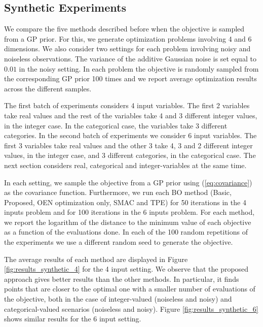 \subsection{Synthetic Experiments}

We compare the five methods described before when the objective is sampled from a GP prior. For this, we generate 
optimization problems involving 4 and 6  dimensions. We also consider two settings for each problem involving noisy and 
noiseless observations. The variance of the additive Gaussian noise is set equal to $0.01$ in the noisy setting.
In each problem the objective is randomly sampled from the corresponding GP prior 100 times and
we report average optimization results across the different samples. 

The first batch of experiments considers 4 input variables. The first 2 variables take real values and the 
rest of the variables take 4 and 3 different integer values, in the integer case. In the categorical case, the variables take 3 different categories. 
In the second batch of experiments we consider 6 input variables. The first 3 variables
take real values and the other 3 take 4, 3 and 2 different integer values, in the integer case, and 3 different 
categories, in the categorical case. The next section considers real, categorical and integer-variables at the same time.

In each setting, we sample the objective from a GP prior using (\ref{eq:covariance}) as the covariance function. 
Furthermore, we run each BO method (Basic, Proposed, OEN optimization only, SMAC and TPE) for 50 iterations in the 
4 inputs problem and for 100 iterations in the 6 inputs problem. For each method, we report the logarithm 
of the distance to the minimum value of each objective as a function of the evaluations done. In each of the 100 
random repetitions of the experiments we use a different random seed to generate the objective.

The average results of each method are displayed in Figure \ref{fig:results_synthetic_4} 
for the 4 input setting. We observe that the proposed approach gives better results than the other methods. 
In particular, it finds points that are closer to the optimal one with a smaller number of evaluations of the 
objective, both in the case of integer-valued (noiseless and noisy) and categorical-valued scenarios (noiseless and noisy). 
Figure \ref{fig:results_synthetic_6} shows similar results for the 6 input setting.



